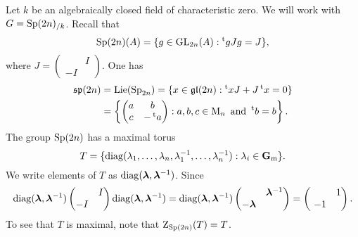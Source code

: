 \begin{example}
Let $k$ be an algebraically closed field of characteristic zero. We will 
work with $G=\operatorname{Sp}(2n)_{/k}$. Recall that 
\[
  \operatorname{Sp}(2n)(A) = \{g\in \operatorname{GL}_{2n}(A):\prescript{\mathrm{t}}{}{g} J g=J\} ,
\]
where $J=\begin{pmatrix} & I \\ -I \end{pmatrix}$. One has 
\begin{align*}
  \mathfrak{sp}(2n)
    &= \operatorname{Lie}(\operatorname{Sp}_{2n}) = \{x\in \mathfrak{gl}(2n):\prescript{\mathrm{t}}{}{x} J + J\prescript{\mathrm{t}}{}{x}=0\} \\
    &= \left\{\begin{pmatrix} a & b \\ c & -\prescript{\mathrm{t}}{}{a} \end{pmatrix}:a,b,c\in \operatorname{M}_n\text{ and }\prescript{\mathrm{t}}{}{b}=b\right\} .
\end{align*}
The group $\operatorname{Sp}(2n)$ has a maximal torus 
\[
  T = \{\operatorname{diag}(\lambda_1,\dots,\lambda_n,\lambda_1^{-1},\dots,\lambda_n^{-1}):\lambda_i\in \mathbf{G}_\mathrm{m}\} .
\]
We write elements of $T$ as $\operatorname{diag}(\bm \lambda,\bm \lambda^{-1})$. Since 
\[
  \diagonal(\bm \lambda,\bm \lambda^{-1}) \begin{pmatrix} & I \\ -I \end{pmatrix} \diagonal(\bm\lambda,\bm \lambda^{-1}) = \diagonal(\bm\lambda,\bm\lambda^{-1})\begin{pmatrix} & \bm \lambda^{-1} \\ -\bm\lambda \end{pmatrix} = \begin{pmatrix} & 1 \\\ -1 \end{pmatrix} .
\]
To see that $T$ is maximal, note that $\operatorname{Z}_{\operatorname{Sp}(2n)}(T)=T$. 


\end{example}
